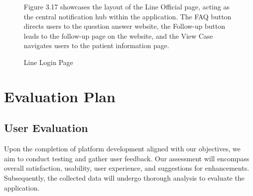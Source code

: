 \documentclass[12pt,oneside,openright,a4paper]{cpe-english-project}
\begin{document}
\begin{figure}[!h]
\begin{minipage}{.3\textwidth}
      \end{minipage}%
    
      \caption{Line Login Page}\label{fig:Line Login Page}
      \begin{flushleft}
        \qquad Figure 3.17 showcases the layout of the Line Official page, acting as the central notification hub within the application. The FAQ button directs users to the question answer website, the Follow-up button leads to the follow-up page on the website, and the View Case navigates users to the patient information page. \par
      \end{flushleft}
    \end{figure}
\newpage
  \section{Evaluation Plan}
    \subsection{User Evaluation}
      \qquad Upon the completion of platform development aligned with our objectives, we aim to conduct testing and gather user feedback. Our assessment will encompass overall satisfaction, usability, user experience, and suggestions for enhancements. Subsequently, the collected data will undergo thorough analysis to evaluate the application. \par
\end{document}
